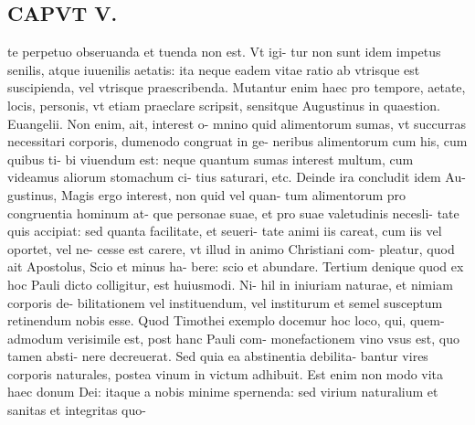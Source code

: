 \documentclass{article}
\begin{document}
\begin{pages}
\section*{CAPVT V. }
\marginpar{[ p.381 ]}\pstart te perpetuo obseruanda et tuenda non est. Vt igi- tur non sunt idem impetus senilis, atque iuuenilis aetatis: ita neque eadem vitae ratio ab vtrisque est suscipienda, vel vtrisque praescribenda. Mutantur enim haec pro tempore, aetate, locis, personis, vt etiam praeclare scripsit, sensitque Augustinus in quaestion. Euangelii. Non enim, ait, interest o- mnino quid alimentorum sumas, vt succurras necessitari corporis, dumenodo congruat in ge- neribus alimentorum cum his, cum quibus ti- bi viuendum est: neque quantum sumas interest multum, cum videamus aliorum stomachum ci- tius saturari, etc. Deinde ira concludit idem Au- gustinus, Magis ergo interest, non quid vel quan- tum alimentorum pro congruentia hominum at- que personae suae, et pro suae valetudinis necesli- tate quis accipiat: sed quanta facilitate, et seueri- tate animi iis careat, cum iis vel oportet, vel ne- cesse est carere, vt illud in animo Christiani com- pleatur, quod ait Apostolus, Scio et minus ha- bere: scio et abundare. Tertium denique quod ex hoc Pauli dicto colligitur, est huiusmodi. Ni- hil in iniuriam naturae, et nimiam corporis de- bilitationem vel instituendum, vel institurum et semel susceptum retinendum nobis esse. Quod Timothei exemplo docemur hoc loco, qui, quem- admodum verisimile est, post hanc Pauli com- monefactionem vino vsus est, quo tamen absti- nere decreuerat. Sed quia ea abstinentia debilita- bantur vires corporis naturales, postea vinum in victum adhibuit. Est enim non modo vita haec donum Dei: itaque a nobis minime spernenda: sed virium naturalium et sanitas et integritas quo-  \pend

\end{pages}
\end{document}
